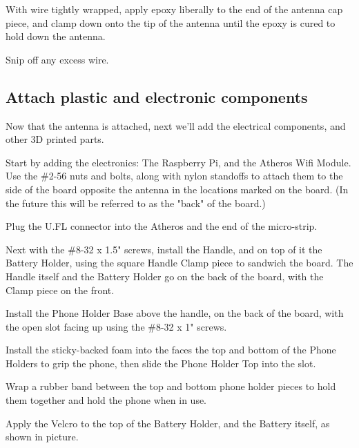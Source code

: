 \documentclass[paper=a4,parskip=full+]{scrartcl}
\begin{document}
\noindent With wire tightly wrapped, apply epoxy liberally to the end of the antenna cap piece, and clamp down onto the tip of the antenna until the epoxy is cured to hold down the antenna.

Snip off any excess wire.


\subsection{Attach plastic and electronic components}
Now that the antenna is attached, next we'll add the electrical components, and other 3D printed parts.

Start by adding the electronics: The Raspberry Pi, and the Atheros Wifi Module. Use the \#2-56 nuts and bolts, along with nylon standoffs to attach them to the side of the board opposite the antenna in the locations marked on the board. (In the future this will be referred to as the "back" of the board.)


Plug the U.FL connector into the Atheros and the end of the micro-strip.


Next with the \#8-32 x 1.5" screws, install the Handle, and on top of it the Battery Holder, using the square Handle Clamp piece to sandwich the board. The Handle itself and the Battery Holder go on the back of the board, with the Clamp piece on the front.

Install the Phone Holder Base above the handle, on the back of the board, with the open slot facing up using the \#8-32 x 1" screws.


Install the sticky-backed foam into the faces the top and bottom of the Phone Holders to grip the phone, then slide the Phone Holder Top into the slot.

Wrap a rubber band between the top and bottom phone holder pieces to hold them together and hold the phone when in use.

Apply the Velcro to the top of the Battery Holder, and the Battery itself, as shown in picture.
\end{document}
